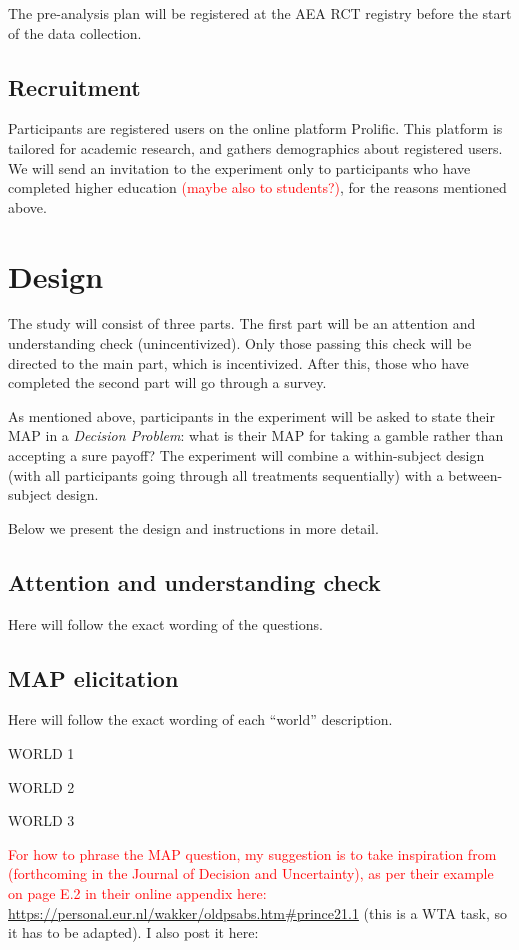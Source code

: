 The pre-analysis plan will be registered at the AEA RCT registry before the start of the data collection.

\subsection{Recruitment}
Participants are registered users on the online platform Prolific.
This platform is tailored for academic research, and gathers demographics about registered users.
We will send an invitation to the experiment only to participants who have completed higher education \textcolor{red}{(maybe also to students?)}, for the reasons mentioned above. 



\section{Design}
The study will consist of three parts.
The first part will be an attention and understanding check (unincentivized).
Only those passing this check will be directed to the main part, which is incentivized.
After this, those who have completed the second part will go through a survey.

As mentioned above, participants in the experiment will be asked to state their MAP in a \textit{Decision Problem}: what is their MAP for taking a gamble rather than accepting a sure payoff?
The experiment will combine a within-subject design (with all participants going through all treatments sequentially) with a between-subject design.

Below we present the design and instructions in more detail.

\subsection{Attention and understanding check}
Here will follow the exact wording of the questions.

\subsection{MAP elicitation}
Here will follow the exact wording of each ``world'' description.

WORLD 1

WORLD 2

WORLD 3

\textcolor{red}{For how to phrase the MAP question, my suggestion is to take inspiration from} \cite{Johnson2019} \textcolor{red}{(forthcoming in the Journal of Decision and Uncertainty), as per their example on page E.2 in their online appendix here:} \url{https://personal.eur.nl/wakker/oldpsabs.htm#prince21.1} (this is a WTA task, so it has to be adapted).
I also post it here:

